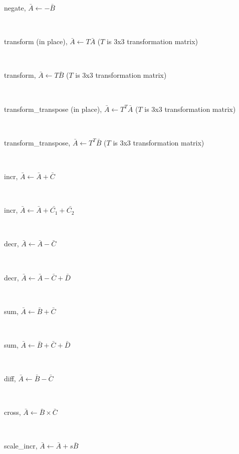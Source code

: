 \begin{description}
  \item[negate, $\bar{A} \leftarrow  -\bar{B}$]\ \newline

  \item[transform (in place), $\bar{A} \leftarrow T\bar{A}$ ($T$ is 3x3 transformation matrix)]\ \newline

  \item[transform, $\bar{A} \leftarrow T\bar{B}$ ($T$ is 3x3 transformation matrix)]\ \newline

  \item[transform\_transpose (in place),  $\bar{A} \leftarrow T^T\bar{A}$ ($T$ is 3x3 transformation matrix)]\ \newline

  \item[transform\_transpose,  $\bar{A} \leftarrow T^T\bar{B}$ ($T$ is 3x3 transformation matrix)]\ \newline

  \item[incr, $\bar{A} \leftarrow \bar{A}+\bar{C}$]\ \newline

  \item[incr, $\bar{A} \leftarrow \bar{A}+\bar{C_1}+\bar{C_2}$]\ \newline

  \item[decr, $\bar{A} \leftarrow \bar{A}-\bar{C}$]\ \newline

  \item[decr, $\bar{A} \leftarrow \bar{A}-\bar{C}+\bar{D}$]\ \newline

  \item[sum, $\bar{A} \leftarrow \bar{B}+\bar{C}$]\ \newline

  \item[sum, $\bar{A} \leftarrow \bar{B}+\bar{C}+\bar{D}$]\ \newline

  \item[diff, $\bar{A} \leftarrow \bar{B}-\bar{C}$]\ \newline

  \item[cross, $\bar{A} \leftarrow \bar{B}\times\bar{C}$]\ \newline

  \item[scale\_incr, $\bar{A} \leftarrow \bar{A}+s\bar{B}$]\ \newline


\end{description}
